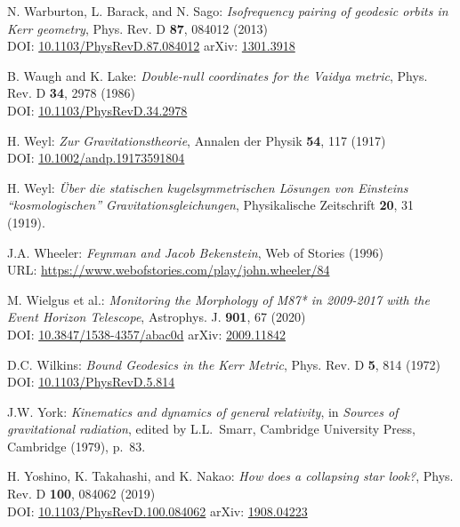 \begin{thebibliography}{123}
N. Warburton, L. Barack, and N. Sago:
{\em Isofrequency pairing of geodesic orbits in Kerr geometry},
Phys. Rev. D {\bf 87}, 084012 (2013)\\
DOI: \href{https://doi.org/10.1103/PhysRevD.87.084012}{10.1103/PhysRevD.87.084012}\hfill
arXiv: \href{https://arxiv.org/abs/1301.3918}{1301.3918}

B. Waugh and K. Lake:
{\em Double-null coordinates for the Vaidya metric},
Phys. Rev. D {\bf 34}, 2978 (1986)\\
DOI: \href{https://doi.org/10.1103/PhysRevD.34.2978}{10.1103/PhysRevD.34.2978}

H. Weyl:
{\em Zur Gravitationstheorie},
Annalen der Physik {\bf 54}, 117 (1917)\\
DOI: \href{https://doi.org/10.1002/andp.19173591804}{10.1002/andp.19173591804}

H. Weyl:
{\em \"Uber die statischen kugelsymmetrischen L\"osungen von Einsteins ``kosmologischen'' Gravitationsgleichungen},
Physikalische Zeitschrift {\bf 20}, 31 (1919).

J.A. Wheeler:
{\em Feynman and Jacob Bekenstein},
Web of Stories (1996)\\
URL: \url{https://www.webofstories.com/play/john.wheeler/84}

M. Wielgus et al.:
{\em Monitoring the Morphology of M87* in 2009-2017 with the Event Horizon Telescope},
Astrophys. J. {\bf 901}, 67 (2020)\\
DOI: \href{https://doi.org/10.3847/1538-4357/abac0d}{10.3847/1538-4357/abac0d}\hfill
arXiv: \href{https://arxiv.org/abs/2009.11842}{2009.11842}

D.C. Wilkins:
{\em Bound Geodesics in the Kerr Metric},
Phys. Rev. D {\bf 5}, 814 (1972)\\
DOI: \href{https://doi.org/10.1103/PhysRevD.5.814}{10.1103/PhysRevD.5.814}

J.W. York:
{\em Kinematics and dynamics of general relativity},
in {\em Sources of gravitational radiation}, edited by L.L.~Smarr,
Cambridge University Press, Cambridge (1979), p.~83.

H. Yoshino, K. Takahashi, and K. Nakao:
{\em How does a collapsing star look?},
Phys. Rev. D {\bf 100}, 084062 (2019)\\
DOI: \href{https://doi-org.ezproxy.obspm.fr/10.1103/PhysRevD.100.084062}{10.1103/PhysRevD.100.084062}\hfill
arXiv: \href{https://arxiv.org/abs/1908.04223}{1908.04223}


\end{thebibliography}
